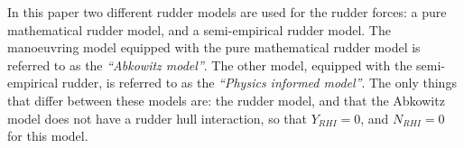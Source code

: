 In this paper two different rudder models are used for the rudder forces: a pure mathematical rudder model, and a semi-empirical rudder model. The manoeuvring model equipped with the pure mathematical rudder model is referred to as the \emph{``Abkowitz model''}. The other model, equipped with the semi-empirical rudder, is referred to as the \emph{``Physics informed model''}. The only things that differ between these models are: the rudder model, and that the Abkowitz model does not have a rudder hull interaction, so that $Y_{RHI}=0$, and $N_{RHI}=0$ for this model.
